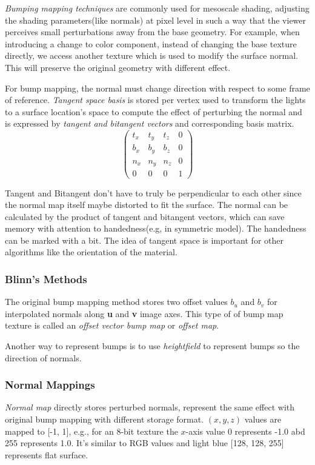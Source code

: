 \documentclass[10pt, a4paper]{article}
\begin{document}
\emph{Bumping mapping techniques} are commonly used for mesoscale shading, adjusting the shading parameters(like normals) at pixel level in such a way that the viewer perceives small perturbations away from the base geometry. For example, when introducing a change to color component, instead of changing the base texture directly, we access another texture which is used to modify the surface normal. This will preserve the original geometry with different effect. 

For bump mapping, the normal must change direction with respect to some frame of reference. \emph{Tangent space basis} is stored per vertex used to transform the lights to a surface location's space to compute the effect of perturbing the normal and is expressed by \emph{tangent and bitangent vectors} and corresponding basis matrix.
\begin{equation*}
    \begin{pmatrix}
    t_x & t_y & t_z & 0 \\
    b_x & b_y & b_z & 0 \\
    n_x & n_y & n_z & 0 \\
    0 & 0 & 0 & 1
    \end{pmatrix}
\end{equation*}  

Tangent and Bitangent don't have to truly be perpendicular to each other since the normal map itself maybe distorted to fit the surface. The normal can be calculated by the product of tangent and bitangent vectors, which can save memory with attention to handedness(e.g, in symmetric model). The handedness can be marked with a bit. The idea of tangent space is important for other algorithms like the orientation of the material. 

    \subsubsection{Blinn's Methods}
        The original bump mapping method stores two offset values $b_u$ and $b_v$ for interpolated normals along \textbf{u} and \textbf{v} image axes. This type of of bump map texture is called an \emph{offset vector bump map} or \emph{offset map}.

        Another way to represent bumps is to use \emph{heightfield} to represent bumps so the direction of normals. 
        
    \subsubsection{Normal Mappings}
        \emph{Normal map} directly stores perturbed normals, represent the same effect with original bump mapping with different storage format. $(x,y,z)$ values are mapped to [-1, 1], e.g., for an 8-bit texture the $x$-axis value 0 represents -1.0 abd 255 represents 1.0. It's similar to RGB values and light blue [128, 128, 255] represents flat surface. 
\end{document}
